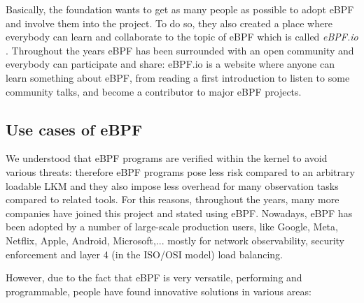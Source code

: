 Basically, the foundation wants to get as many people as possible to adopt eBPF and involve them into the project.
To do so, they also created a place where everybody can learn and collaborate to the topic of eBPF which is called \textit{eBPF.io} \cite{eBPFioWebsite}.
Throughout the years eBPF has been surrounded with an open community and everybody can participate and share: eBPF.io is a website where anyone can learn something about eBPF, from reading a first introduction to listen to some community talks, and become a contributor to major eBPF projects.

\subsection{Use cases of eBPF}

We understood that eBPF programs are verified within the kernel to avoid various threats: therefore eBPF programs pose less risk compared to an arbitrary loadable LKM and they also impose less overhead for many observation tasks compared to related tools.
For this reasons, throughout the years, many more companies have joined this project and stated using eBPF.
Nowadays, eBPF has been adopted by a number of large-scale production users, like Google, Meta, Netflix, Apple, Android, Microsoft,... mostly for network observability, security enforcement and layer 4 (in the ISO/OSI model) load balancing.

However, due to the fact that eBPF is very versatile, performing and programmable, people have found innovative solutions in various areas:


